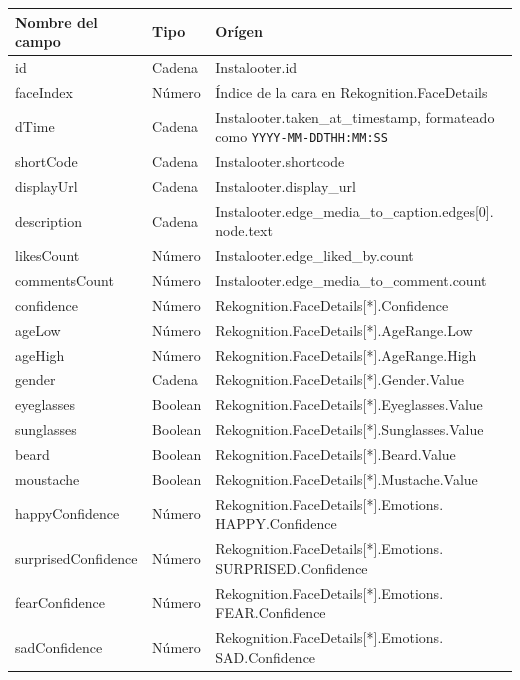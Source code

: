 \begin{table}[H]
    \hspace*{-1.5cm}
    \centering
    \begin{tabular}{|p{}|p{}|p{}|}
    \hline
	Nombre del campo & Tipo & Orígen \\ \hline
	id & Cadena & Instalooter.id \\ \hline
	faceIndex & Número & Índice de la cara en Rekognition.FaceDetails \\ \hline
	dTime & Cadena & Instalooter.taken\_at\_timestamp, formateado como \texttt{YYYY-MM-DDTHH:MM:SS} \\ \hline
	shortCode & Cadena & Instalooter.shortcode \\ \hline
	displayUrl & Cadena & Instalooter.display\_url \\ \hline
	description & Cadena & Instalooter.edge\_media\_to\_caption.edges{[}0{]}. node.text \\ \hline
	likesCount & Número & Instalooter.edge\_liked\_by.count \\ \hline
	commentsCount & Número & Instalooter.edge\_media\_to\_comment.count \\ \hline
	confidence & Número & Rekognition.FaceDetails{[}*{]}.Confidence \\ \hline
	ageLow & Número & Rekognition.FaceDetails{[}*{]}.AgeRange.Low \\ \hline
	ageHigh & Número & Rekognition.FaceDetails{[}*{]}.AgeRange.High \\ \hline
	gender & Cadena & Rekognition.FaceDetails{[}*{]}.Gender.Value \\ \hline
	eyeglasses & Boolean & Rekognition.FaceDetails{[}*{]}.Eyeglasses.Value \\ \hline
	sunglasses & Boolean & Rekognition.FaceDetails{[}*{]}.Sunglasses.Value \\ \hline
	beard & Boolean & Rekognition.FaceDetails{[}*{]}.Beard.Value \\ \hline
	moustache & Boolean & Rekognition.FaceDetails{[}*{]}.Mustache.Value \\ \hline
	happyConfidence & Número & Rekognition.FaceDetails{[}*{]}.Emotions. HAPPY.Confidence \\ \hline
	surprisedConfidence & Número & Rekognition.FaceDetails{[}*{]}.Emotions. SURPRISED.Confidence \\ \hline
	fearConfidence & Número & Rekognition.FaceDetails{[}*{]}.Emotions. FEAR.Confidence \\ \hline
	sadConfidence & Número & Rekognition.FaceDetails{[}*{]}.Emotions. SAD.Confidence \\ \hline
    \end{tabular}
\end{table}
